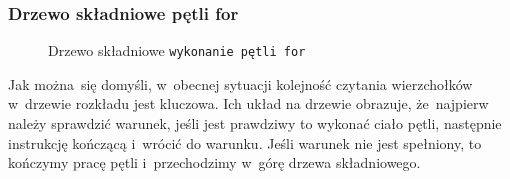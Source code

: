 \documentclass[10pt,t]{beamer}
\begin{document}
\begin{frame}
  \frametitle{Drzewo składniowe pętli for}


  \begin{figure}


    \caption{Drzewo składniowe \texttt{wykonanie pętli for}}

    \label{fig:Scheme-of-CPU}

  \end{figure}





  Jak można~się domyśli, w~obecnej sytuacji kolejność czytania wierzchołków
  w~drzewie rozkładu jest kluczowa. Ich układ na drzewie obrazuje,
  że~najpierw należy sprawdzić warunek, jeśli jest prawdziwy to wykonać
  ciało pętli, następnie instrukcję kończącą i~wrócić do warunku. Jeśli
  warunek nie jest spełniony, to kończymy pracę pętli i~przechodzimy w~górę
  drzewa składniowego.


\end{frame}
\end{document}
